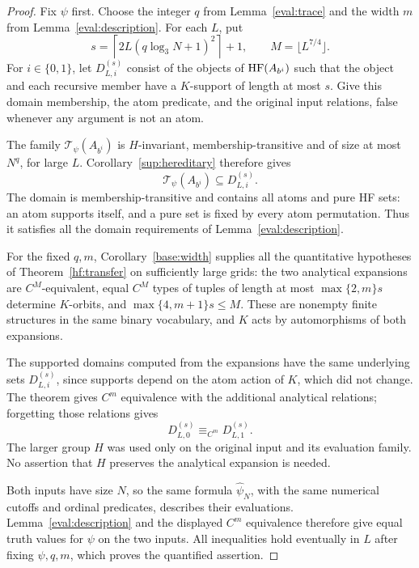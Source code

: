 \begin{proof}
Fix \(\psi\) first.  Choose the integer \(q\) from
Lemma~\ref{eval:trace} and the width \(m\) from
Lemma~\ref{eval:description}.  For each \(L\), put
\[
 s=\left\lceil2L(q\log_3N+1)^2\right\rceil+1,
 \qquad M=\lfloor L^{7/4}\rfloor.
\]
For \(i\in\{0,1\}\), let \(D_{L,i}^{(s)}\) consist of the objects of
\(\operatorname{HF}(A_{b^i})\) such that the object and each recursive member have
a \(K\)-support of length at most \(s\).
Give this domain membership, the atom predicate, and the original input
relations, false whenever any argument is not an atom.

The family \(\mathcal T_\psi(A_{b^i})\) is \(H\)-invariant,
membership-transitive and of size at most \(N^q\), for large \(L\).
Corollary~\ref{sup:hereditary} therefore gives
\[
          \mathcal T_\psi(A_{b^i})\subseteq D_{L,i}^{(s)}.
\]
The domain is membership-transitive and contains all atoms and pure HF
sets: an atom supports itself, and a pure set is fixed by every atom
permutation.  Thus it satisfies all the domain requirements of
Lemma~\ref{eval:description}.

For the fixed \(q,m\), Corollary~\ref{base:width} supplies all the
quantitative hypotheses of Theorem~\ref{hf:transfer} on sufficiently
large grids: the two analytical expansions are \(C^M\)-equivalent,
equal \(C^M\) types of tuples of length at most \(\max\{2,m\}s\)
determine \(K\)-orbits, and \(\max\{4,m+1\}s\le M\).
These are nonempty finite structures in the same binary vocabulary,
and \(K\) acts by automorphisms of both expansions.

The supported domains computed from the expansions have the same
underlying sets \(D_{L,i}^{(s)}\), since supports depend on the atom action
of \(K\), which did not change.  The theorem gives \(C^m\) equivalence
with the additional analytical relations; forgetting those relations
gives
\[
                 D_{L,0}^{(s)}\equiv_{C^m}D_{L,1}^{(s)}.
\]
The larger group \(H\) was used only on the original input and its
evaluation family.  No assertion that \(H\) preserves the analytical
expansion is needed.

Both inputs have size \(N\), so the same formula
\(\widehat\psi_N\), with the same numerical cutoffs and ordinal
predicates, describes their evaluations.
Lemma~\ref{eval:description} and the displayed \(C^m\) equivalence
therefore give equal truth values for \(\psi\) on the two inputs.
All inequalities hold eventually in \(L\) after fixing \(\psi,q,m\),
which proves the quantified assertion.
\end{proof}

